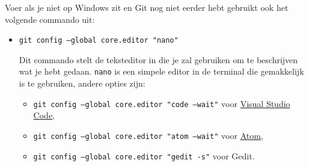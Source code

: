 \documentclass[a4paper]{extarticle}
\newcommand{\shell}[1]{\texttt{#1}}
\begin{document}
Voer als je niet op Windows zit en Git nog niet eerder hebt gebruikt ook het volgende commando uit:
\begin{itemize}
	\item \shell{git config --global core.editor "nano"}

		Dit commando stelt de teksteditor in die je zal gebruiken om te beschrijven wat je hebt gedaan. \shell{nano} is
		een simpele editor in de terminal die gemakkelijk is te gebruiken, andere opties zijn:

		\begin{itemize}
			\item \shell{git config --global core.editor "code --wait"} voor \href{https://code.visualstudio.com}{Visual Studio Code},
			\item \shell{git config --global core.editor "atom --wait"} voor \href{https://atom.io}{Atom},
			\item \shell{git config --global core.editor "gedit -s"} voor Gedit.
		\end{itemize}
\end{itemize}
\end{document}
